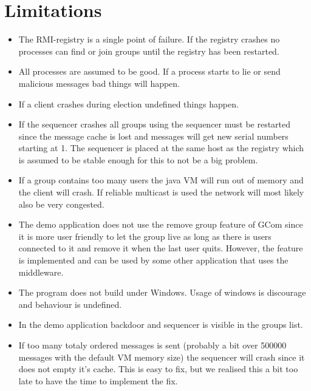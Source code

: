 \documentclass[a4paper,english]{article}
\begin{document}
\section{Limitations}
\begin{itemize}
\item The RMI-registry is a single point of failure. If the registry crashes no processes can find or join groups until the registry has been restarted.

\item All processes are assumed to be good. If a process starts to lie or send malicious messages bad things will happen.

\item If a client crashes during election undefined things happen.

\item If the sequencer crashes all groups using the sequencer must be restarted since the message cache is lost and messages will get new serial numbers starting at 1. The sequencer is placed at the same host as the registry which is assumed to be stable enough for this to not be a big problem.

\item If a group contains too many users the java VM will run out of memory and the client will crash. If reliable multicast is used the network will most likely also be very congested.

\item The demo application does not use the remove group feature of GCom since it is more user friendly to let the group live as long as there is users connected to it and remove it when the last user quits. However, the feature is implemented and can be used by some other application that uses the middleware.

\item The program does not build under Windows. Usage of windows is discourage and behaviour is undefined.

\item In the demo application backdoor and sequencer is visible in the groups list.

\item If too many totaly ordered messages is sent (probably a bit over 500000 messages with the default VM memory size) the sequencer will crash since it does not empty it's cache. This is easy to fix, but we realised this a bit too late to have the time to implement the fix.

\end{itemize}
\end{document}
